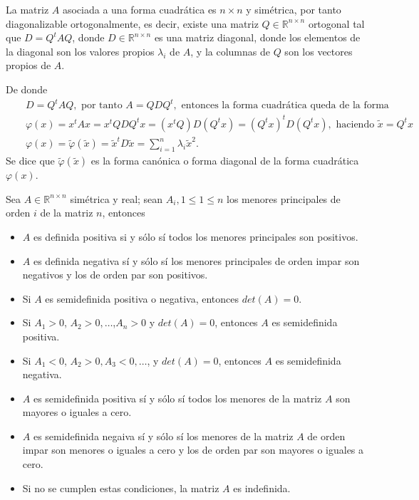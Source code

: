 \begin{Note}
La matriz $A$ asociada a una forma cuadr\'atica es $n\times n$ y sim\'etrica, por tanto diagonalizable ortogonalmente, es decir, existe una matriz $Q\in \mathbb{R}^{n\times n}$ ortogonal tal que $D=Q^{t}AQ$, donde $D\in\mathbb{R}^{n\times n}$ es una matriz diagonal, donde los elementos de la diagonal son los valores propios $\lambda_{i}$ de $A$, y la columnas de $Q$ son los vectores propios de $A$.

De donde
\begin{eqnarray*}
&&D=Q^{t}AQ,\textrm{ por tanto }A=QDQ^{t}, \textrm{ entonces la forma cuadr\'atica queda de la forma }\\
&&\varphi\left(x\right)=x^{t}Ax=x^{t}QDQ^{t}x=\left(x^{t}Q\right)D\left(Q^{t}x\right)=\left(Q^{t}x\right)^{t}D\left(Q^{t}x\right),\textrm{ haciendo  }\tilde{x}=Q^{t}x\\
&&\varphi\left(x\right)=\tilde{\varphi}\left(\tilde{x}\right)=\tilde{x}^{t}D\tilde{x}=\sum_{i=1}^{n}\lambda_{i}\tilde{x}^{2}.
\end{eqnarray*}
Se dice que $\tilde{\varphi}\left(\tilde{x}\right)$ es la forma can\'onica o forma diagonal de la forma cuadr\'atica $\varphi\left(x\right)$.
\end{Note}

\begin{Teo}
Sea $A\in\mathbb{R}^{n\times n}$ sim\'etrica y real; sean $A_{i},1\leq1\leq n$ los menores principales de orden $i$ de la matriz $n$, entonces
\begin{itemize}
\item[i) ] $A$ es definida positiva si y s\'olo s\'i todos los menores principales son positivos.

\item[ii) ] $A$ es definida negativa s\'i y s\'olo s\'i los menores principales de orden impar son negativos y los de orden par son positivos.

\item[iii) ] Si $A$ es semidefinida positiva o negativa, entonces $det(A)=0$.
\item[iv) ] Si $A_{1}>0$, $A_{2}>0,\dots$,$A_{n}>0$ y $det(A)=0$, entonces $A$ es semidefinida positiva.
\item[v) ] Si $A_{1}<0$, $A_{2}>0,A_{3}<0,\dots$, y $det(A)=0$, entonces $A$ es semidefinida negativa.
\item[vi) ] $A$ es semidefinida positiva s\'i y s\'olo s\'i todos los menores de la matriz $A$ son mayores o iguales a cero.
\item[vii) ] $A$ es semidefinida negaiva s\'i y s\'olo s\'i  los menores de la matriz $A$ de orden impar son menores o iguales a cero y los de orden par son mayores o iguales a cero.
\item[viii) ] Si no se cumplen estas condiciones, la matriz $A$ es indefinida.


\end{itemize}

\end{Teo}


